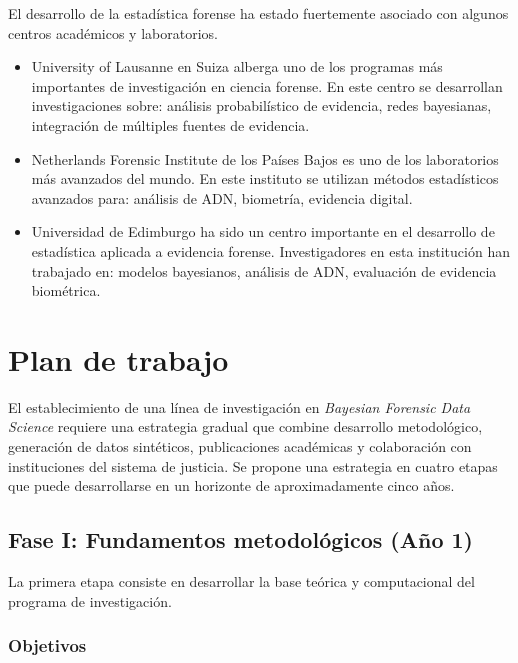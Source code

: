 \documentclass[a4paper,10pt,oneside]{article}
\begin{document}
El desarrollo de la estad\'istica forense ha estado fuertemente asociado con algunos centros acad\'emicos y laboratorios.

\begin{itemize}
\item University of Lausanne en Suiza alberga uno de los programas m\'as importantes de investigaci\'on en ciencia forense. En este centro se desarrollan investigaciones sobre:  an\'alisis probabil\'istico de evidencia, redes bayesianas, integraci\'on de m\'ultiples fuentes de evidencia.

\item Netherlands Forensic Institute de los Pa\'ises Bajos es uno de los laboratorios m\'as avanzados del mundo. En este instituto se utilizan m\'etodos estad\'isticos avanzados para: an\'alisis de ADN, biometr\'ia, evidencia digital.

\item Universidad de Edimburgo ha sido un centro importante en el desarrollo de estad\'istica aplicada a evidencia forense. Investigadores en esta instituci\'on han trabajado en: modelos bayesianos, an\'alisis de ADN, evaluaci\'on de evidencia biom\'etrica.
\end{itemize}

\section{Plan de trabajo}

El establecimiento de una l\'inea de investigaci\'on en \textit{Bayesian Forensic Data Science} requiere una estrategia gradual que combine desarrollo metodol\'ogico, generaci\'on de datos sint\'eticos, publicaciones acad\'emicas y colaboraci\'on con instituciones del sistema de justicia. Se propone una estrategia en cuatro etapas que puede desarrollarse en un horizonte de aproximadamente cinco a\~nos.

\subsection{Fase I: Fundamentos metodol\'ogicos (A\~no 1)}

La primera etapa consiste en desarrollar la base te\'orica y computacional del programa de investigaci\'on.

\subsubsection*{Objetivos}
\end{document}
